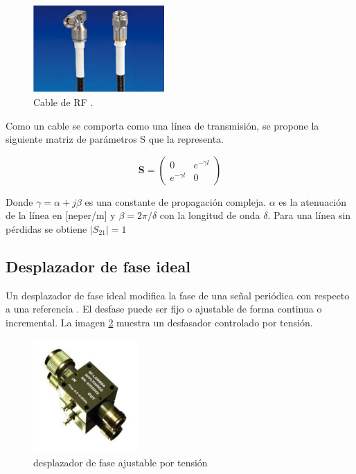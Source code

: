 \begin{figure}[H]
 \centering
 \includegraphics[width=5cm]{gfx/cableRF.png}
 \caption{Cable de RF \cite{Gore2013}.}
 \label{fig:cableRF}
\end{figure}

Como un cable se comporta como una línea de transmisión, se propone la siguiente matriz de parámetros S que la 
representa.

$$
\mathbf{S} = \begin{pmatrix} 0 & e^{-\gamma l}\\e^{-\gamma l} & 0\end{pmatrix}
$$

Donde $\gamma = \alpha + j\beta$ es una constante de propagación compleja. $\alpha$ es la atenuación de la línea en [neper/m]
y $\beta = 2\pi/\delta$ con la longitud de onda $\delta$. Para una línea sin pérdidas se obtiene $|S_{21}| = 1$

\subsection{Desplazador de fase ideal}

Un desplazador de fase ideal modifica la fase de una señal periódica con respecto a una referencia \cite{Standard1996}. El 
desfase puede ser fijo o ajustable de forma continua o incremental. La imagen \ref{fig:phaseShifter} muestra un desfasador 
controlado por tensión.

\begin{figure}[H]
 \centering
 \includegraphics[width=4cm]{gfx/phaseShifter.png}
 \caption{desplazador de fase ajustable por tensión \cite{Shifter}}
 \label{fig:phaseShifter}
\end{figure}

